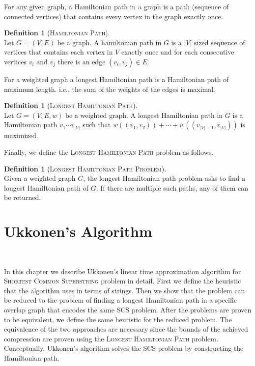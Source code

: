 \documentclass[english,twoside,censored,csm,algorithms-track-2020]{HYthesisML}
\theoremstyle{plain}
\theoremstyle{definition}
\newtheorem{definition}[theorem]{Definition}
\begin{document}
For any given graph, a Hamiltonian path in a graph is a path (sequence of connected vertices)
that contains every vertex in the graph exactly once.

\begin{definition}[\textsc{Hamiltonian Path}]~\label{def-hampath}\\
  Let $G=(V,E)$ be a graph. A hamiltonian path in $G$ is a $|V|$ sized sequence of vertices
  that contains each vertex in $V$ exactly once and for each consecutive vertices $v_i$ and
  $v_j$ there is an edge $(v_i,v_j)\in E$.
\end{definition}

For a weighted graph a longest Hamiltonian path is a Hamiltonian path of maximum length.
i.e., the sum of the weights of the edges is maximal.

\begin{definition}[\textsc{Longest Hamiltonian Path}]~\label{def-longest-hampath}\\
  Let $G=(V,E,w)$ be a weighted graph. A longest Hamiltonian path in $G$ is a Hamiltonian
  path $v_1\cdots v_{|V|}$ such that $w((v_1,v_2))+\cdots +w((v_{|V|-1},v_{|V|}))$ is maximized.
\end{definition}

Finally, we define the \textsc{Longest Hamiltonian Path} problem as follows.

\begin{definition}[\textsc{Longest Hamiltonian Path Problem}]~\label{def-longest-hampat-problem}\\
  Given a weighted graph $G$, the longest Hamiltonian path problem asks to find a
  longest Hamiltonian path of $G$. If there are multiple such paths, any of them can
  be returned.
\end{definition}

\chapter{Ukkonen's Algorithm}~\label{chp-ukkonen}

In this chapter we describe Ukkonen's linear time approximation algorithm \citep{Ukkonen90} for
\textsc{Shortest Common Superstring} problem in detail. First we define the heuristic that the
algorithm uses in terms of strings. Then we show that the problem can be reduced to the problem
of finding a longest Hamiltonian path in a specific overlap graph that encodes the same SCS problem.
After the problems are proven to be equivalent, we define the same heuristic for the reduced problem.
The equivalence of the two approaches are necessary since the bounds of the achieved compression
are proven using the \textsc{Longest Hamiltonian Path} problem. Conceptually, Ukkonen's algorithm 
solves the SCS problem by constructing the Hamiltonian path.
\end{document}
